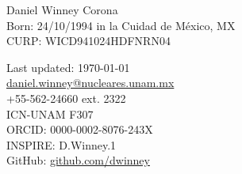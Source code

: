 \documentclass[letterpaper,11pt]{article}
\newcommand{\github}[1]{\href{https://github.com/#1/}{github.com/#1}}
\newcommand{\email}[1]{\href{mailto:#1}{#1}}
\newcommand{\headinginline}[2]{
    \begin{minipage}[t]{0.60\textwidth}
    \fontfamily{put} \selectfont
    \vspace*{\fill}
    \Huge \textcolor{color-title}{#1}
    \end{minipage}
    \begin{minipage}[t]{0.35\textwidth}
    \begin{flushright}
    #2
    \end{flushright}
    \end{minipage}
}
\begin{document}
\headinginline
{   Daniel Winney Corona
    \\ [-0.3em]
    {\small Born: 24/10/1994 in la Cuidad de M\'exico, MX 
    \\[-1.4em]
    \small CURP: WICD941024HDFNRN04
    \\[-1.5em]
    \small }
}
{   
    {\small Last updated: \today}\\
        
    \email{daniel.winney@nucleares.unam.mx} \\
    +55-562-24660 ext. 2322 \\
    ICN-UNAM F307\\[0.5em] 
    ORCID: 0000-0002-8076-243X \\
    INSPIRE: D.Winney.1      \\ 
    GitHub: \github{dwinney} 
}
\vspace{-1.9em}

\end{document}
